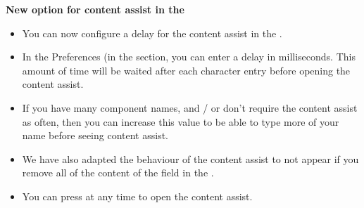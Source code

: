 \textbf{New option for content assist in the \gdcompnamesview{}}
\begin{itemize}
\item You can now configure a delay for the content assist in the \gdcompnamesview{}.
\item In the Preferences (in the  section, you can enter a delay in milliseconds. This amount of time will be waited after each character entry before opening the content assist.
\item If you have many component names, and / or don't require the content assist as often, then you can increase this value to be able to type more of your name before seeing content assist.
\item We have also adapted the behaviour of the content assist to not appear if you remove all of the content of the  field in the \gdcompnamesview{}. 
\item You can press  at any time to open the content assist.
\end{itemize}
